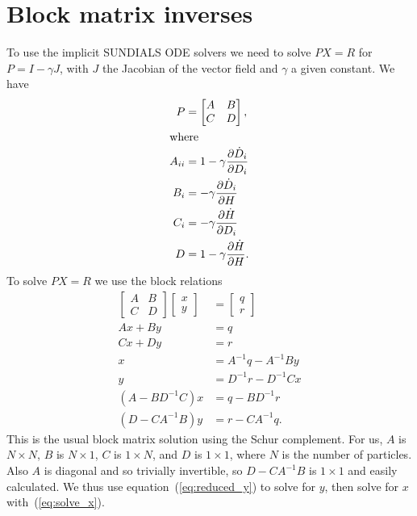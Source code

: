 \documentclass{article}
\begin{document}
\section{Block matrix inverses}
\label{sec:block-matr-invers}

To use the implicit SUNDIALS ODE solvers we need to solve $P X = R$
for $P = I - \gamma J$, with $J$ the Jacobian of the vector field and
$\gamma$ a given constant. We have
\begin{align}
  P &= \begin{bmatrix} A & B \\ C & D \end{bmatrix}, \\
\intertext{where}
  A_{ii} &= 1 - \gamma \frac{\partial \dot{D}_i}{\partial D_i} \\
  B_i &= - \gamma \frac{\partial \dot{D}_i}{\partial H} \\
  C_i &= - \gamma \frac{\partial \dot{H}}{\partial D_i} \\
  D &= 1 - \gamma \frac{\partial \dot{H}}{\partial H}.
\end{align}
To solve $P X = R$ we use the block relations
\begin{align}
  \begin{bmatrix} A & B \\ C & D \end{bmatrix}
  \begin{bmatrix} x \\ y \end{bmatrix}
  &=
  \begin{bmatrix} q \\ r \end{bmatrix} \\
  A x + B y &= q \\
  C x + D y &= r \\
  x &= A^{-1} q - A^{-1} B y \label{eq:solve_x} \\
  y &= D^{-1} r - D^{-1} C x \label{eq:solve_y} \\
  (A - B D^{-1} C) x &= q - B D^{-1} r \label{eq:reduced_x} \\
  (D - C A^{-1} B) y &= r - C A^{-1} q. \label{eq:reduced_y}
\end{align}
This is the usual block matrix solution using the Schur
complement. For us, $A$ is $N \times N$, $B$ is $N \times 1$, $C$ is
$1 \times N$, and $D$ is $1 \times 1$, where $N$ is the number of
particles. Also $A$ is diagonal and so trivially invertible, so $D - C
A^{-1} B$ is $1 \times 1$ and easily calculated. We thus use
equation~(\ref{eq:reduced_y}) to solve for $y$, then solve for $x$
with~(\ref{eq:solve_x}).
\end{document}
